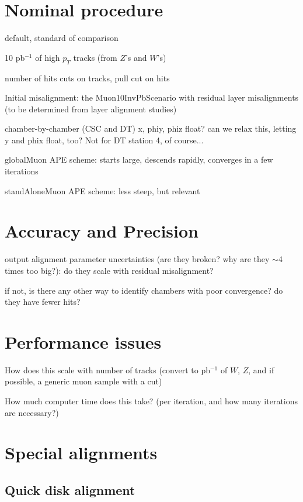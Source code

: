 \documentclass[12pt]{article}
\begin{document}
\section{Nominal procedure}

default, standard of comparison

10 pb$^{-1}$ of high $p_T$ tracks (from $Z$'s and $W$'s)

number of hits cuts on tracks, pull cut on hits

Initial misalignment: the Muon10InvPbScenario with residual layer
misalignments (to be determined from layer alignment studies)

chamber-by-chamber (CSC and DT) x, phiy, phiz float?  can we relax
this, letting y and phix float, too?  Not for DT station 4, of course...

globalMuon APE scheme: starts large, descends rapidly, converges
in a few iterations

standAloneMuon APE scheme: less steep, but relevant

\section{Accuracy and Precision}

output alignment parameter uncertainties (are they broken?  why
are they $\sim$4 times too big?): do they scale with residual
misalignment?

if not, is there any other way to identify chambers with poor
convergence?  do they have fewer hits?

\section{Performance issues}

How does this scale with number of tracks (convert to pb$^{-1}$ of $W$,
$Z$, and if possible, a generic muon sample with a cut)

How much computer time does this take?  (per iteration, and how
many iterations are necessary?)

\section{Special alignments}

\subsection{Quick disk alignment}
\end{document}
